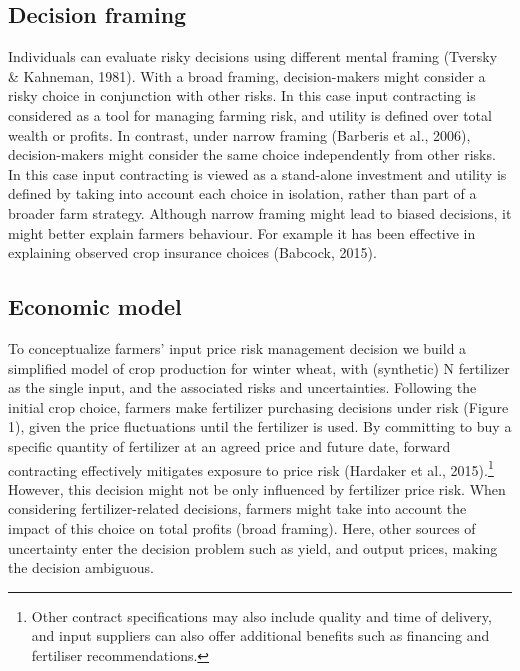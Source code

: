 \documentclass[
]{article}
\begin{document}
\subsection{\texorpdfstring{Decision framing
}{Decision framing }}\label{decision-framing}

Individuals can evaluate risky decisions using different mental framing
(Tversky \& Kahneman, 1981). With a broad framing, decision-makers might
consider a risky choice in conjunction with other risks. In this case
input contracting is considered as a tool for managing farming risk, and
utility is defined over total wealth or profits. In contrast, under
narrow framing (Barberis et al., 2006), decision-makers might consider
the same choice independently from other risks. In this case input
contracting is viewed as a stand-alone investment and utility is defined
by taking into account each choice in isolation, rather than part of a
broader farm strategy. Although narrow framing might lead to biased
decisions, it might better explain farmers behaviour. For example it has
been effective in explaining observed crop insurance choices (Babcock,
2015).

\subsection{\texorpdfstring{Economic model
}{Economic model }}\label{economic-model}

To conceptualize farmers' input price risk management decision we build
a simplified model of crop production for winter wheat, with (synthetic)
N fertilizer as the single input, and the associated risks and
uncertainties. Following the initial crop choice, farmers make
fertilizer purchasing decisions under risk (Figure 1), given the price
fluctuations until the fertilizer is used. By committing to buy a
specific quantity of fertilizer at an agreed price and future date,
forward contracting effectively mitigates exposure to price risk
(Hardaker et al., 2015).\footnote{Other contract specifications may also
  include quality and time of delivery, and input suppliers can also
  offer additional benefits such as financing and fertiliser
  recommendations.} However, this decision might not be only influenced
by fertilizer price risk. When considering fertilizer-related decisions,
farmers might take into account the impact of this choice on total
profits (broad framing). Here, other sources of uncertainty enter the
decision problem such as yield, and output prices, making the decision
ambiguous.
\end{document}
